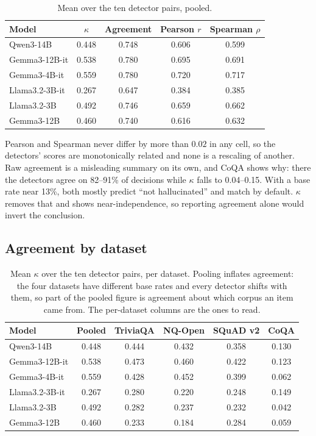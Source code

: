 \begin{table}[h]
  \centering
  \caption{Mean over the ten detector pairs, pooled.}
  \footnotesize
  \begin{tabular}{l c c c c}
    \hline
    Model & $\kappa$ & Agreement & Pearson $r$ & Spearman $\rho$ \\
    \hline
    Qwen3-14B & 0.448 & 0.748 & 0.606 & 0.599 \\
    Gemma3-12B-it & 0.538 & 0.780 & 0.695 & 0.691 \\
    Gemma3-4B-it & 0.559 & 0.780 & 0.720 & 0.717 \\
    Llama3.2-3B-it & 0.267 & 0.647 & 0.384 & 0.385 \\
    Llama3.2-3B & 0.492 & 0.746 & 0.659 & 0.662 \\
    Gemma3-12B & 0.460 & 0.740 & 0.616 & 0.632 \\
    \hline
  \end{tabular}
\end{table}

Pearson and Spearman never differ by more than $0.02$ in any cell, so the
detectors' scores are monotonically related and none is a rescaling of another. Raw
agreement is a misleading summary on its own, and CoQA shows why: there the detectors
agree on 82--91\% of decisions while $\kappa$ falls to 0.04--0.15. With a base rate near
13\%, both mostly predict ``not hallucinated'' and match by default. $\kappa$ removes that
and shows near-independence, so reporting agreement alone would invert the conclusion.

\subsection{Agreement by dataset}

\begin{table}[h]
  \centering
  \caption{Mean $\kappa$ over the ten detector pairs, per dataset. Pooling inflates
  agreement: the four datasets have different base rates and every detector shifts
  with them, so part of the pooled figure is agreement about which corpus an item
  came from. The per-dataset columns are the ones to read.}
  \footnotesize
  \begin{tabular}{l c c c c c}
    \hline
    Model & Pooled & TriviaQA & NQ-Open & SQuAD v2 & CoQA \\
    \hline
    Qwen3-14B & 0.448 & 0.444 & 0.432 & 0.358 & 0.130 \\
    Gemma3-12B-it & 0.538 & 0.473 & 0.460 & 0.422 & 0.123 \\
    Gemma3-4B-it & 0.559 & 0.428 & 0.452 & 0.399 & 0.062 \\
    Llama3.2-3B-it & 0.267 & 0.280 & 0.220 & 0.248 & 0.149 \\
    Llama3.2-3B & 0.492 & 0.282 & 0.237 & 0.232 & 0.042 \\
    Gemma3-12B & 0.460 & 0.233 & 0.184 & 0.284 & 0.059 \\
    \hline
  \end{tabular}
\end{table}

